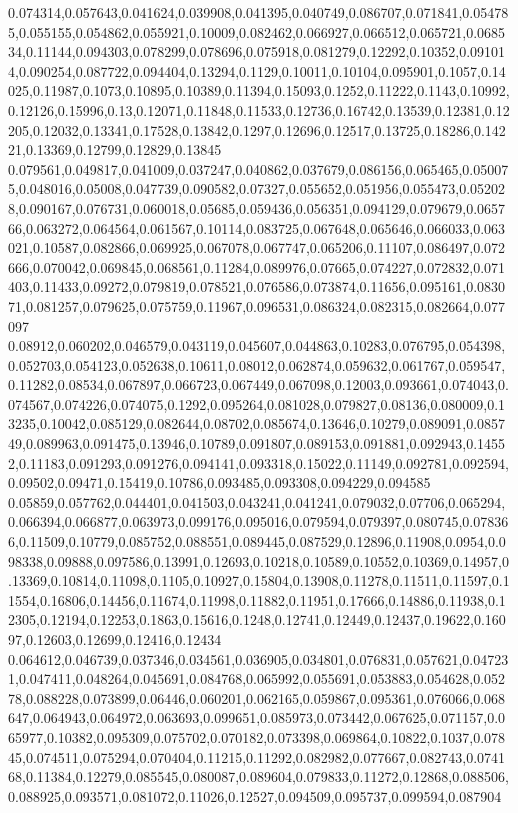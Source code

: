 0.074314,0.057643,0.041624,0.039908,0.041395,0.040749,0.086707,0.071841,0.054785,0.055155,0.054862,0.055921,0.10009,0.082462,0.066927,0.066512,0.065721,0.068534,0.11144,0.094303,0.078299,0.078696,0.075918,0.081279,0.12292,0.10352,0.091014,0.090254,0.087722,0.094404,0.13294,0.1129,0.10011,0.10104,0.095901,0.1057,0.14025,0.11987,0.1073,0.10895,0.10389,0.11394,0.15093,0.1252,0.11222,0.1143,0.10992,0.12126,0.15996,0.13,0.12071,0.11848,0.11533,0.12736,0.16742,0.13539,0.12381,0.12205,0.12032,0.13341,0.17528,0.13842,0.1297,0.12696,0.12517,0.13725,0.18286,0.14221,0.13369,0.12799,0.12829,0.13845
0.079561,0.049817,0.041009,0.037247,0.040862,0.037679,0.086156,0.065465,0.050075,0.048016,0.05008,0.047739,0.090582,0.07327,0.055652,0.051956,0.055473,0.052028,0.090167,0.076731,0.060018,0.05685,0.059436,0.056351,0.094129,0.079679,0.065766,0.063272,0.064564,0.061567,0.10114,0.083725,0.067648,0.065646,0.066033,0.063021,0.10587,0.082866,0.069925,0.067078,0.067747,0.065206,0.11107,0.086497,0.072666,0.070042,0.069845,0.068561,0.11284,0.089976,0.07665,0.074227,0.072832,0.071403,0.11433,0.09272,0.079819,0.078521,0.076586,0.073874,0.11656,0.095161,0.083071,0.081257,0.079625,0.075759,0.11967,0.096531,0.086324,0.082315,0.082664,0.077097
0.08912,0.060202,0.046579,0.043119,0.045607,0.044863,0.10283,0.076795,0.054398,0.052703,0.054123,0.052638,0.10611,0.08012,0.062874,0.059632,0.061767,0.059547,0.11282,0.08534,0.067897,0.066723,0.067449,0.067098,0.12003,0.093661,0.074043,0.074567,0.074226,0.074075,0.1292,0.095264,0.081028,0.079827,0.08136,0.080009,0.13235,0.10042,0.085129,0.082644,0.08702,0.085674,0.13646,0.10279,0.089091,0.085749,0.089963,0.091475,0.13946,0.10789,0.091807,0.089153,0.091881,0.092943,0.14552,0.11183,0.091293,0.091276,0.094141,0.093318,0.15022,0.11149,0.092781,0.092594,0.09502,0.09471,0.15419,0.10786,0.093485,0.093308,0.094229,0.094585
0.05859,0.057762,0.044401,0.041503,0.043241,0.041241,0.079032,0.07706,0.065294,0.066394,0.066877,0.063973,0.099176,0.095016,0.079594,0.079397,0.080745,0.078366,0.11509,0.10779,0.085752,0.088551,0.089445,0.087529,0.12896,0.11908,0.0954,0.098338,0.09888,0.097586,0.13991,0.12693,0.10218,0.10589,0.10552,0.10369,0.14957,0.13369,0.10814,0.11098,0.1105,0.10927,0.15804,0.13908,0.11278,0.11511,0.11597,0.11554,0.16806,0.14456,0.11674,0.11998,0.11882,0.11951,0.17666,0.14886,0.11938,0.12305,0.12194,0.12253,0.1863,0.15616,0.1248,0.12741,0.12449,0.12437,0.19622,0.16097,0.12603,0.12699,0.12416,0.12434
0.064612,0.046739,0.037346,0.034561,0.036905,0.034801,0.076831,0.057621,0.047231,0.047411,0.048264,0.045691,0.084768,0.065992,0.055691,0.053883,0.054628,0.05278,0.088228,0.073899,0.06446,0.060201,0.062165,0.059867,0.095361,0.076066,0.068647,0.064943,0.064972,0.063693,0.099651,0.085973,0.073442,0.067625,0.071157,0.065977,0.10382,0.095309,0.075702,0.070182,0.073398,0.069864,0.10822,0.1037,0.07845,0.074511,0.075294,0.070404,0.11215,0.11292,0.082982,0.077667,0.082743,0.074168,0.11384,0.12279,0.085545,0.080087,0.089604,0.079833,0.11272,0.12868,0.088506,0.088925,0.093571,0.081072,0.11026,0.12527,0.094509,0.095737,0.099594,0.087904
